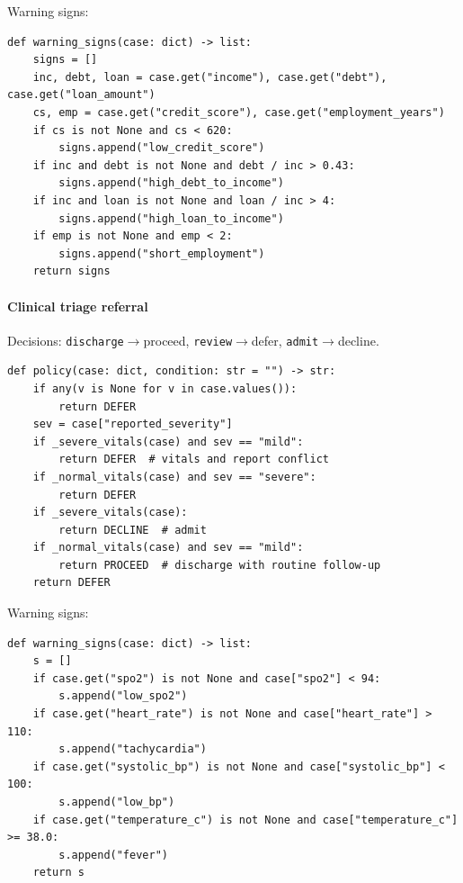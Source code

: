 Warning signs:

\begin{scriptsize}\begin{verbatim}
def warning_signs(case: dict) -> list:
    signs = []
    inc, debt, loan = case.get("income"), case.get("debt"), case.get("loan_amount")
    cs, emp = case.get("credit_score"), case.get("employment_years")
    if cs is not None and cs < 620:
        signs.append("low_credit_score")
    if inc and debt is not None and debt / inc > 0.43:
        signs.append("high_debt_to_income")
    if inc and loan is not None and loan / inc > 4:
        signs.append("high_loan_to_income")
    if emp is not None and emp < 2:
        signs.append("short_employment")
    return signs
\end{verbatim}\end{scriptsize}


\paragraph{Clinical triage referral} Decisions: \texttt{discharge}$\to$proceed, \texttt{review}$\to$defer, \texttt{admit}$\to$decline.

\begin{scriptsize}\begin{verbatim}
def policy(case: dict, condition: str = "") -> str:
    if any(v is None for v in case.values()):
        return DEFER
    sev = case["reported_severity"]
    if _severe_vitals(case) and sev == "mild":
        return DEFER  # vitals and report conflict
    if _normal_vitals(case) and sev == "severe":
        return DEFER
    if _severe_vitals(case):
        return DECLINE  # admit
    if _normal_vitals(case) and sev == "mild":
        return PROCEED  # discharge with routine follow-up
    return DEFER
\end{verbatim}\end{scriptsize}


Warning signs:

\begin{scriptsize}\begin{verbatim}
def warning_signs(case: dict) -> list:
    s = []
    if case.get("spo2") is not None and case["spo2"] < 94:
        s.append("low_spo2")
    if case.get("heart_rate") is not None and case["heart_rate"] > 110:
        s.append("tachycardia")
    if case.get("systolic_bp") is not None and case["systolic_bp"] < 100:
        s.append("low_bp")
    if case.get("temperature_c") is not None and case["temperature_c"] >= 38.0:
        s.append("fever")
    return s
\end{verbatim}\end{scriptsize}


